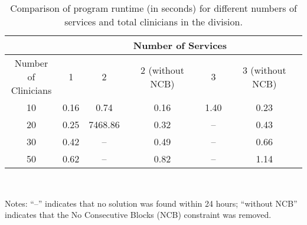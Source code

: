 \begin{table}[htbp]
	\centering
 	\caption{Comparison of program runtime (in seconds) for different numbers of services and total clinicians in the division.}%
  \label{tbl:runtime-services-clinicians-comparison}%
	\begin{tabular}{|c|c||c|c||c|c|}
		\toprule
		                                      &  \multicolumn{5}{c|}{Number of Services}  \\ \midrule
		\makecell[l]{Number of \\ Clinicians} &  1   &    2    & 2 (without NCB) &  3   & 3 (without NCB) \\ \midrule
		                 10                   & 0.16 &  0.74   &  0.16   & 1.40 &  0.23   \\ \hline
		                 20                   & 0.25 & 7468.86 &  0.32   &  --  &  0.43   \\ \hline
		                 30                   & 0.42 &    --   &  0.49   &  --  &  0.66   \\ \hline
		                 50                   & 0.62 &    --   &  0.82   &  --  &  1.14   \\ \bottomrule
	\end{tabular}\\[1em]
  \footnotesize\raggedright
  Notes:
  ``--'' indicates that no solution was found within 24 hours;
  ``without NCB'' indicates that the No Consecutive Blocks (NCB) constraint was removed.
\end{table}